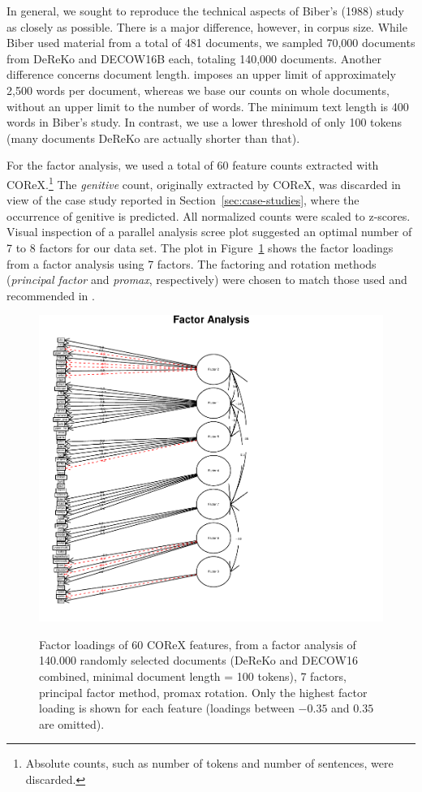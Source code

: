 In general, we sought to reproduce the technical aspects of Biber's (1988) study as closely as possible.
There is a major difference, however, in corpus size.
While Biber used material from a total of 481 documents, %
 we sampled 70,000 documents from DeReKo and DECOW16B each, totaling 140,000 documents.
Another difference concerns document length.
\cite{Biber1988} imposes an upper limit of approximately 2,500 words per document, whereas we base our counts on whole documents, without an upper limit to the number of words.
The minimum text length is 400 words in Biber's study.
In contrast, we use a lower threshold of only 100 tokens (many documents DeReKo are actually shorter than that).

For the factor analysis, we used a total of 60 feature counts extracted with COReX.\footnote{Absolute counts, such as number of tokens and number of sentences, were discarded.}
The \textit{genitive} count, originally extracted by COReX, was discarded in view of the case study reported in Section~\ref{sec:case-studies}, where the occurrence of genitive is predicted.
 All normalized counts were scaled to z-scores.
 Visual inspection of a parallel analysis scree plot suggested an optimal number of 7 to 8 factors for our data set.
 The plot in Figure~\ref{fa-pa-7-factors} shows the factor loadings from a factor analysis using 7 factors.
 The factoring and rotation methods (\textit{principal factor} and \textit{promax}, respectively) were chosen to match those used and recommended in \cite{Biber1988}.
 
 
\begin{figure}
   \includegraphics[scale=.9]{../R/plots/fa-fa-7-promax-padded}
   \label{fa-pa-7-factors}
  \caption{Factor loadings of 60 COReX features, from a factor analysis of 140.000 randomly selected documents (DeReKo and DECOW16 combined, minimal document length = 100 tokens), 7 factors, principal factor method, promax rotation. Only the highest factor loading is shown for each feature (loadings between $-0.35$ and $0.35$ are omitted).}  
\end{figure}



